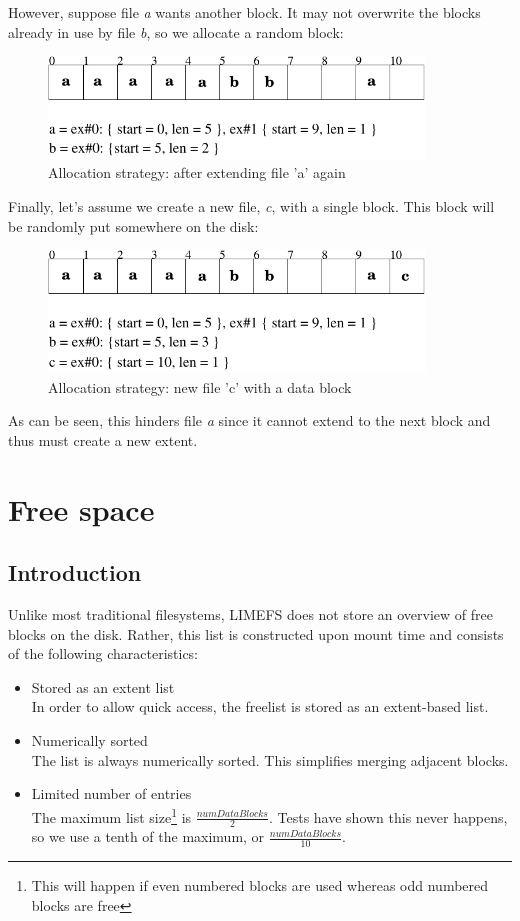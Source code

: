 However, suppose file \emph{a} wants another block. It may not overwrite the blocks already in use by file \emph{b}, so we allocate a random block:

\begin{figure}[h]
\includegraphics[width=10cm]{alloc3}
\caption{Allocation strategy: after extending file 'a' again}
\end{figure}

Finally, let's assume we create a new file, \emph{c}, with a single block. This block will be randomly put somewhere on the disk:

\begin{figure}[h]
\includegraphics[width=10cm]{alloc4}
\caption{Allocation strategy: new file 'c' with a data block}
\end{figure}

As can be seen, this hinders file \emph{a} since it cannot extend to the next block and thus must create a new extent.

\section{Free space}
\label{freespace}

\subsection{Introduction}

Unlike most traditional filesystems, LIMEFS does not store an overview of free blocks on the disk. Rather, this list is constructed upon mount time and consists of the following characteristics:

\begin{itemize}
\item Stored as an extent list \\
In order to allow quick access, the freelist is stored as an extent-based list.
\item Numerically sorted \\
The list is always numerically sorted. This simplifies merging adjacent blocks.
\item Limited number of entries \\
The maximum list size\footnote{This will happen if even numbered blocks are used whereas odd numbered blocks are free} is $\frac{numDataBlocks}{2}$. Tests have shown this never happens, so we use a tenth of the maximum, or $\frac{numDataBlocks}{10}$.
\end{itemize}


